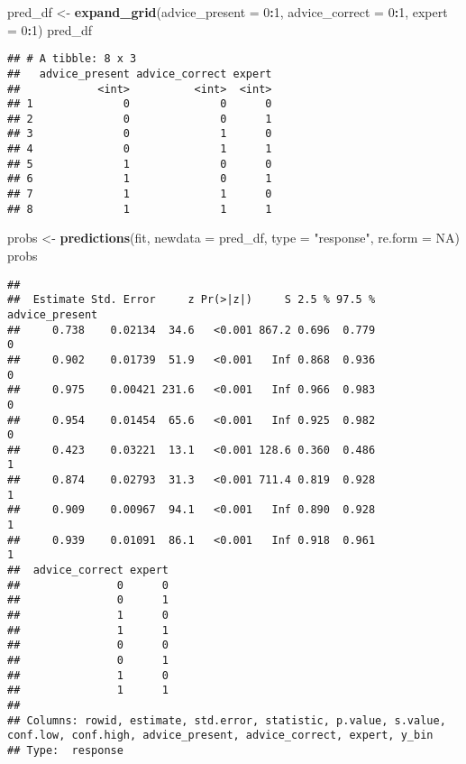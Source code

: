 \documentclass[
  man,floatsintext]{apa6}
\newenvironment{Shaded}{\begin{snugshade}}{\end{snugshade}}
\newcommand{\AttributeTok}[1]{\textcolor[rgb]{0.13,0.29,0.53}{#1}}
\newcommand{\ConstantTok}[1]{\textcolor[rgb]{0.56,0.35,0.01}{#1}}
\newcommand{\DecValTok}[1]{\textcolor[rgb]{0.00,0.00,0.81}{#1}}
\newcommand{\FunctionTok}[1]{\textcolor[rgb]{0.13,0.29,0.53}{\textbf{#1}}}
\newcommand{\NormalTok}[1]{#1}
\newcommand{\OtherTok}[1]{\textcolor[rgb]{0.56,0.35,0.01}{#1}}
\newcommand{\SpecialCharTok}[1]{\textcolor[rgb]{0.81,0.36,0.00}{\textbf{#1}}}
\newcommand{\StringTok}[1]{\textcolor[rgb]{0.31,0.60,0.02}{#1}}
\begin{document}
\begin{Shaded}
\begin{Highlighting}[]
\NormalTok{pred\_df }\OtherTok{\textless{}{-}} \FunctionTok{expand\_grid}\NormalTok{(}\AttributeTok{advice\_present =} \DecValTok{0}\SpecialCharTok{:}\DecValTok{1}\NormalTok{, }\AttributeTok{advice\_correct =} \DecValTok{0}\SpecialCharTok{:}\DecValTok{1}\NormalTok{, }\AttributeTok{expert =} \DecValTok{0}\SpecialCharTok{:}\DecValTok{1}\NormalTok{)}
\NormalTok{pred\_df}
\end{Highlighting}
\end{Shaded}

\begin{verbatim}
## # A tibble: 8 x 3
##   advice_present advice_correct expert
##            <int>          <int>  <int>
## 1              0              0      0
## 2              0              0      1
## 3              0              1      0
## 4              0              1      1
## 5              1              0      0
## 6              1              0      1
## 7              1              1      0
## 8              1              1      1
\end{verbatim}

\begin{Shaded}
\begin{Highlighting}[]
\NormalTok{probs }\OtherTok{\textless{}{-}} \FunctionTok{predictions}\NormalTok{(fit, }\AttributeTok{newdata =}\NormalTok{ pred\_df, }\AttributeTok{type =} \StringTok{"response"}\NormalTok{, }\AttributeTok{re.form =} \ConstantTok{NA}\NormalTok{)}
\NormalTok{probs}
\end{Highlighting}
\end{Shaded}

\begin{verbatim}
## 
##  Estimate Std. Error     z Pr(>|z|)     S 2.5 % 97.5 % advice_present
##     0.738    0.02134  34.6   <0.001 867.2 0.696  0.779              0
##     0.902    0.01739  51.9   <0.001   Inf 0.868  0.936              0
##     0.975    0.00421 231.6   <0.001   Inf 0.966  0.983              0
##     0.954    0.01454  65.6   <0.001   Inf 0.925  0.982              0
##     0.423    0.03221  13.1   <0.001 128.6 0.360  0.486              1
##     0.874    0.02793  31.3   <0.001 711.4 0.819  0.928              1
##     0.909    0.00967  94.1   <0.001   Inf 0.890  0.928              1
##     0.939    0.01091  86.1   <0.001   Inf 0.918  0.961              1
##  advice_correct expert
##               0      0
##               0      1
##               1      0
##               1      1
##               0      0
##               0      1
##               1      0
##               1      1
## 
## Columns: rowid, estimate, std.error, statistic, p.value, s.value, conf.low, conf.high, advice_present, advice_correct, expert, y_bin 
## Type:  response
\end{verbatim}
\end{document}
